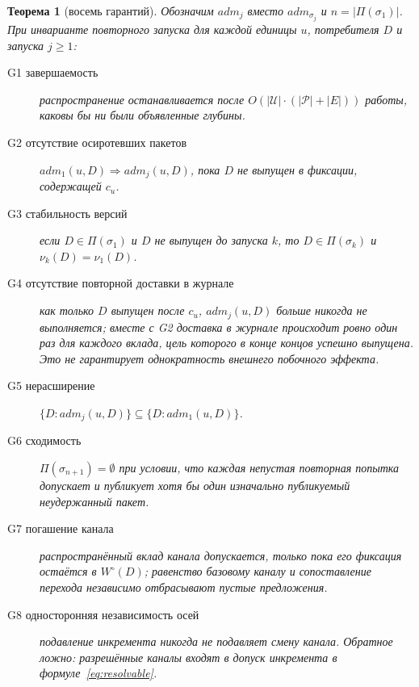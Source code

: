 \documentclass[sigconf,nonacm]{acmart}
\theoremstyle{acmplain}
\newtheorem{theorem}{Теорема}[section]
\theoremstyle{acmdefinition}
\theoremstyle{acmplain}
\newcommand{\G}[1]{G#1}
\begin{document}
\begin{theorem}[восемь гарантий]
\label{thm:g}
Обозначим $\mathit{adm}_j$ вместо $\mathit{adm}_{\sigma_j}$ и $n =
|\Pi(\sigma_1)|$. При инварианте повторного запуска для каждой единицы $u$, потребителя
$D$ и запуска $j \geq 1$:
\begin{description}
  \item[\G{1} завершаемость] распространение останавливается после $O(|\mathcal{U}|
    \cdot (|\mathcal{P}|{+}|E|))$ работы, каковы бы ни были объявленные глубины.
  \item[\G{2} отсутствие осиротевших пакетов] $\mathit{adm}_1(u,D) \Rightarrow
    \mathit{adm}_j(u,D)$, пока $D$ не выпущен в фиксации, содержащей
    $c_u$.
  \item[\G{3} стабильность версий] если $D \in \Pi(\sigma_1)$ и $D$ не
    выпущен до запуска $k$, то $D \in \Pi(\sigma_k)$ и $\nu_k(D) =
    \nu_1(D)$.
  \item[\G{4} отсутствие повторной доставки в журнале] как только $D$ выпущен после $c_u$,
    $\mathit{adm}_j(u,D)$ больше никогда не выполняется; вместе с \G{2} доставка
    в журнале происходит ровно один раз для каждого вклада, цель которого
    в конце концов успешно выпущена. Это не гарантирует однократность
    внешнего побочного эффекта.
  \item[\G{5} нерасширение] $\{D : \mathit{adm}_j(u,D)\} \subseteq
    \{D : \mathit{adm}_1(u,D)\}$.
  \item[\G{6} сходимость] $\Pi(\sigma_{n+1}) = \emptyset$ при условии, что
    каждая непустая повторная попытка допускает и публикует хотя бы один
    изначально публикуемый неудержанный пакет.
  \item[\G{7} погашение канала] распространённый вклад канала допускается,
    только пока его фиксация остаётся в $W^\circ(D)$; равенство базовому
    каналу и сопоставление перехода независимо отбрасывают пустые предложения.
  \item[\G{8} односторонняя независимость осей] подавление инкремента
    никогда не подавляет смену канала. Обратное ложно: разрешённые каналы
    входят в допуск инкремента в формуле~\ref{eq:resolvable}.
\end{description}
\end{theorem}
\end{document}
